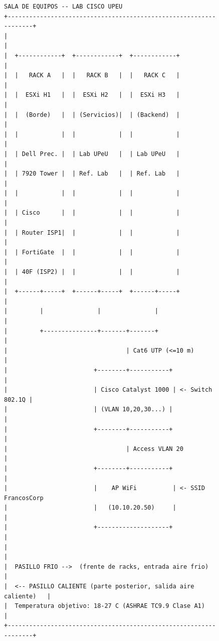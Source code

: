 \documentclass[11pt, a4paper, oneside]{report}
\begin{document}
\begin{figure}[H]
\centering
\begin{lstlisting}[style=diagrama, caption={Layout físico Sede Central · Laboratorio Cisco UPeU · Vista de planta}, label={fig:layout_sede_central}]
 SALA DE EQUIPOS -- LAB CISCO UPEU
+------------------------------------------------------------------+
|                                                                  |
|  +------------+  +------------+  +------------+                 |
|  |   RACK A   |  |   RACK B   |  |   RACK C   |                 |
|  |  ESXi H1   |  |  ESXi H2   |  |  ESXi H3   |                 |
|  |  (Borde)   |  | (Servicios)|  | (Backend)  |                 |
|  |            |  |            |  |            |                 |
|  | Dell Prec. |  | Lab UPeU   |  | Lab UPeU   |                 |
|  | 7920 Tower |  | Ref. Lab   |  | Ref. Lab   |                 |
|  |            |  |            |  |            |                 |
|  | Cisco      |  |            |  |            |                 |
|  | Router ISP1|  |            |  |            |                 |
|  | FortiGate  |  |            |  |            |                 |
|  | 40F (ISP2) |  |            |  |            |                 |
|  +------+-----+  +------+-----+  +------+-----+                 |
|         |               |               |                       |
|         +---------------+-------+-------+                       |
|                                 | Cat6 UTP (<=10 m)             |
|                        +--------+-----------+                   |
|                        | Cisco Catalyst 1000 | <- Switch 802.1Q |
|                        | (VLAN 10,20,30...) |                   |
|                        +--------+-----------+                   |
|                                 | Access VLAN 20                |
|                        +--------+-----------+                   |
|                        |    AP WiFi          | <- SSID FrancosCorp
|                        |   (10.10.20.50)     |                  |
|                        +--------------------+                   |
|                                                                  |
|  PASILLO FRIO -->  (frente de racks, entrada aire frio)         |
|  <-- PASILLO CALIENTE (parte posterior, salida aire caliente)   |
|  Temperatura objetivo: 18-27 C (ASHRAE TC9.9 Clase A1)         |
+------------------------------------------------------------------+
\end{lstlisting}
\end{figure}
\end{document}
